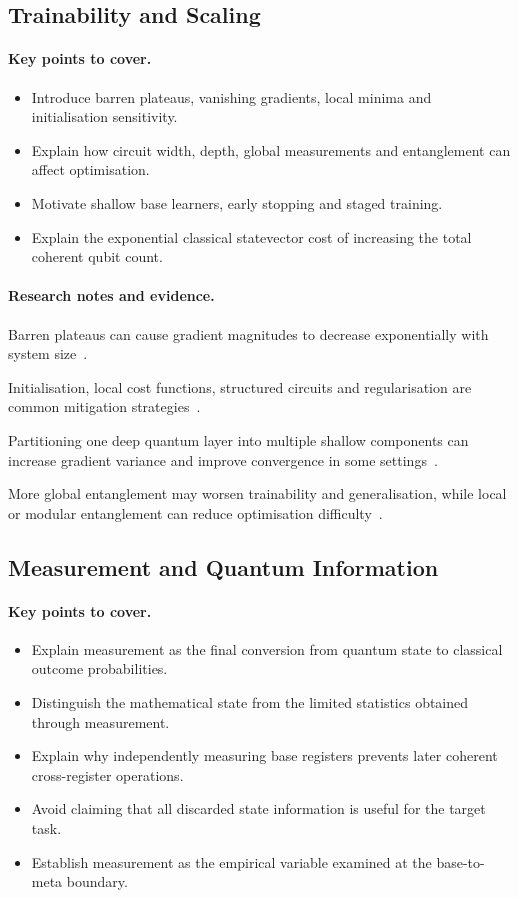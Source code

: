 \documentclass[]{UCD_CS_MSc_AAI_Report}
\newcommand{\challenge}[1]{{\color{red}#1}}
\newcommand{\method}[1]{{\color{cyan!80!black}#1}}
\newcommand{\sectionbrief}{\paragraph{Key points to cover.}}
\newcommand{\researchnotes}{\paragraph{Research notes and evidence.}}
\begin{document}
\subsection{Trainability and Scaling}

\sectionbrief
\begin{itemize}
    \item Introduce barren plateaus, vanishing gradients, local minima and initialisation sensitivity.
    \item Explain how circuit width, depth, global measurements and entanglement can affect optimisation.
    \item Motivate shallow base learners, early stopping and staged training.
    \item Explain the exponential classical statevector cost of increasing the total coherent qubit count.
\end{itemize}

\researchnotes
\begin{itemize}
    \challenge{\item Barren plateaus can cause gradient magnitudes to decrease exponentially with system size~\cite{du_quantum_2025,cerezo_challenges_2022}.}
    \method{\item Initialisation, local cost functions, structured circuits and regularisation are common mitigation strategies~\cite{du_quantum_2025}.}
    \method{\item Partitioning one deep quantum layer into multiple shallow components can increase gradient variance and improve convergence in some settings~\cite{friedrich_quantum_2025}.}
    \challenge{\item More global entanglement may worsen trainability and generalisation, while local or modular entanglement can reduce optimisation difficulty~\cite{park_addressing_2025}.}
\end{itemize}

\subsection{Measurement and Quantum Information}

\sectionbrief
\begin{itemize}
    \item Explain measurement as the final conversion from quantum state to classical outcome probabilities.
    \item Distinguish the mathematical state from the limited statistics obtained through measurement.
    \item Explain why independently measuring base registers prevents later coherent cross-register operations.
    \item Avoid claiming that all discarded state information is useful for the target task.
    \item Establish measurement as the empirical variable examined at the base-to-meta boundary.
\end{itemize}
\end{document}
